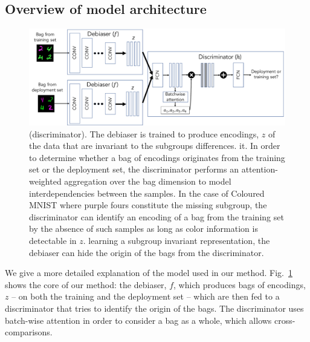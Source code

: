 \subsection{Overview of model architecture}\label{sec:model-arch}
\begin{figure}[htp]
    \centering
    \includegraphics[width=\textwidth]{supmatch/figures/illustrations/architecture.pdf}
    \caption{%
      (discriminator). The debiaser is trained to produce encodings, $z$ of the data that are
      invariant to the subgroups differences. %
      it. In order to determine whether a bag of encodings originates from the training set or the
      deployment set, the discriminator performs an attention-weighted aggregation over the bag
      dimension to model interdependencies between the samples. In the case of Coloured MNIST where
      {\color{purple}purple} fours constitute the missing subgroup, the discriminator can identify
      an encoding of a bag from the training set by the absence of such samples as long as color
      information is detectable in $z$. %
    learning a subgroup invariant representation, the debiaser can hide the origin of the bags from
  the discriminator.} \label{fig:architecture}
\end{figure}%
%
We give a more detailed explanation of the model used in our method.
Fig.~\ref{fig:architecture} shows the core of our method:
the debiaser, $f$, which produces bags of encodings, $z$
-- on both the training and the deployment set --
which are then fed to a discriminator that tries to identify the origin of the bags.
The discriminator uses batch-wise attention in order to consider a bag as a whole,
which allows cross-comparisons.
%
